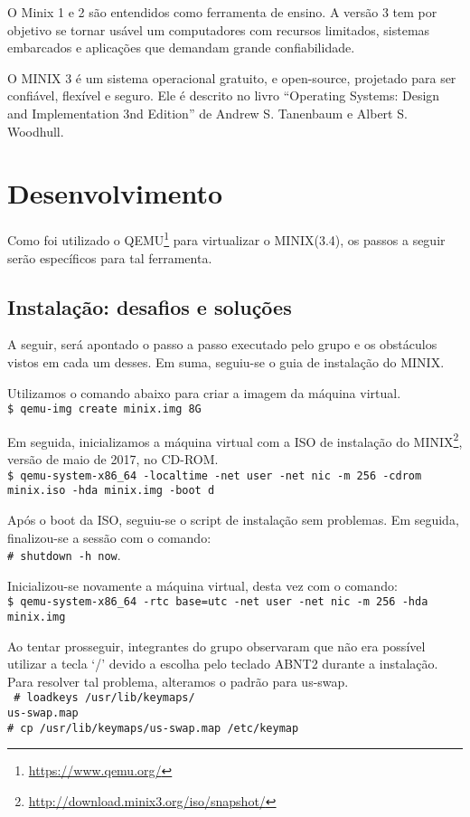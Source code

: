 \documentclass[12pt,journal,compsoc]{IEEEtran}
\begin{document}
O Minix 1 e 2 são entendidos como ferramenta de ensino. A versão 3 tem por objetivo se tornar usável um computadores com recursos limitados, sistemas embarcados e aplicações que demandam grande confiabilidade.

O MINIX 3 é um sistema operacional gratuito, e open-source, projetado para ser confiável, flexível e seguro. Ele é descrito no livro ``Operating Systems: Design and Implementation 3nd Edition'' de Andrew S. Tanenbaum e Albert S. Woodhull.

\section{Desenvolvimento}
Como foi utilizado o QEMU\footnote{\url{https://www.qemu.org/}} para virtualizar o MINIX(3.4), os passos a seguir serão específicos para tal ferramenta.

\subsection{Instalação: desafios e soluções}

A seguir, será apontado o passo a passo executado pelo grupo e os obstáculos vistos em cada um desses. Em suma, seguiu-se o guia de instalação do MINIX\cite{runningQEMU:MINIX3}.

Utilizamos o comando abaixo para criar a imagem da máquina virtual.
\\\texttt{\$ qemu-img create minix.img 8G}

Em seguida, inicializamos a máquina virtual com a ISO de instalação do MINIX\footnote{\url{http://download.minix3.org/iso/snapshot/}}, versão de maio de 2017, no CD-ROM.
\\\texttt{\$ qemu-system-x86\_64 -localtime -net user -net nic -m 256 -cdrom minix.iso -hda minix.img -boot d}

Após o boot da ISO, seguiu-se o script de instalação sem problemas. Em seguida, finalizou-se a sessão com o comando:\\\texttt{\# shutdown -h now}. 

Inicializou-se novamente a máquina virtual, desta vez com o comando:
\\\texttt{\$ qemu-system-x86\_64 -rtc base=utc -net user -net nic -m 256 -hda minix.img}

Ao tentar prosseguir, integrantes do grupo observaram que não era possível utilizar a tecla `/' devido a escolha pelo teclado ABNT2 durante a instalação. Para resolver tal problema, alteramos o padrão para us-swap.
\\\texttt{
\# loadkeys /usr/lib/keymaps/\\us-swap.map\\
\# cp /usr/lib/keymaps/us-swap.map /etc/keymap}
\end{document}
